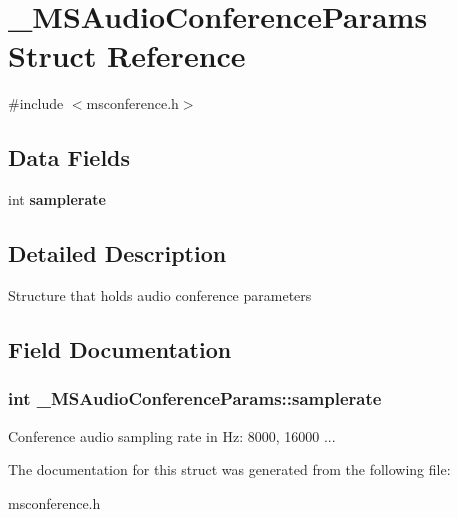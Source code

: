 \section{\-\_\-\-M\-S\-Audio\-Conference\-Params Struct Reference}
\label{struct__MSAudioConferenceParams}


{\ttfamily \#include $<$msconference.\-h$>$}

\subsection*{Data Fields}
\begin{DoxyCompactItemize}
\item 
int {\bf samplerate}
\end{DoxyCompactItemize}


\subsection{Detailed Description}
Structure that holds audio conference parameters 

\subsection{Field Documentation}
\subsubsection[{samplerate}]{\setlength{\rightskip}{0pt plus 5cm}int \-\_\-\-M\-S\-Audio\-Conference\-Params\-::samplerate}\label{struct__MSAudioConferenceParams_a9ee6b148963e984df1c841c2abb92c42}
Conference audio sampling rate in Hz\-: 8000, 16000 ... 

The documentation for this struct was generated from the following file\-:\begin{DoxyCompactItemize}
\item 
msconference.\-h\end{DoxyCompactItemize}
